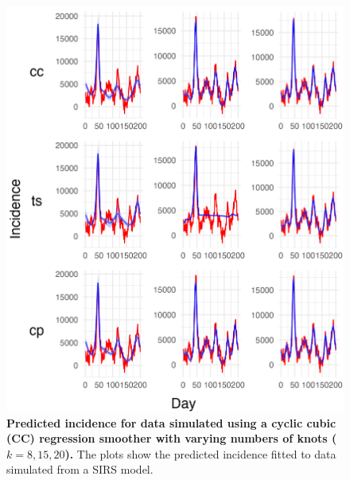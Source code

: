 \documentclass[
11pt, %
oneside, %
english, %
singlespacing, %
]{macthesis} %
\begin{document}
\begin{figure}
\centering
\includegraphics[width=\textwidth]{figure/Simulated/simulation_cc_20_k(8,15,20)_bsd2_beta2_plot_incidence.png}
\caption[Predicted Simulated Data (CC) Incidence]{\textbf{Predicted incidence for data simulated using a cyclic cubic (CC) regression smoother with varying numbers of knots (\(k = 8, 15, 20\)).} The plots show the predicted incidence fitted to data simulated from a SIRS model.}
\label{fig:incidence20cc}
\end{figure}
\end{document}
